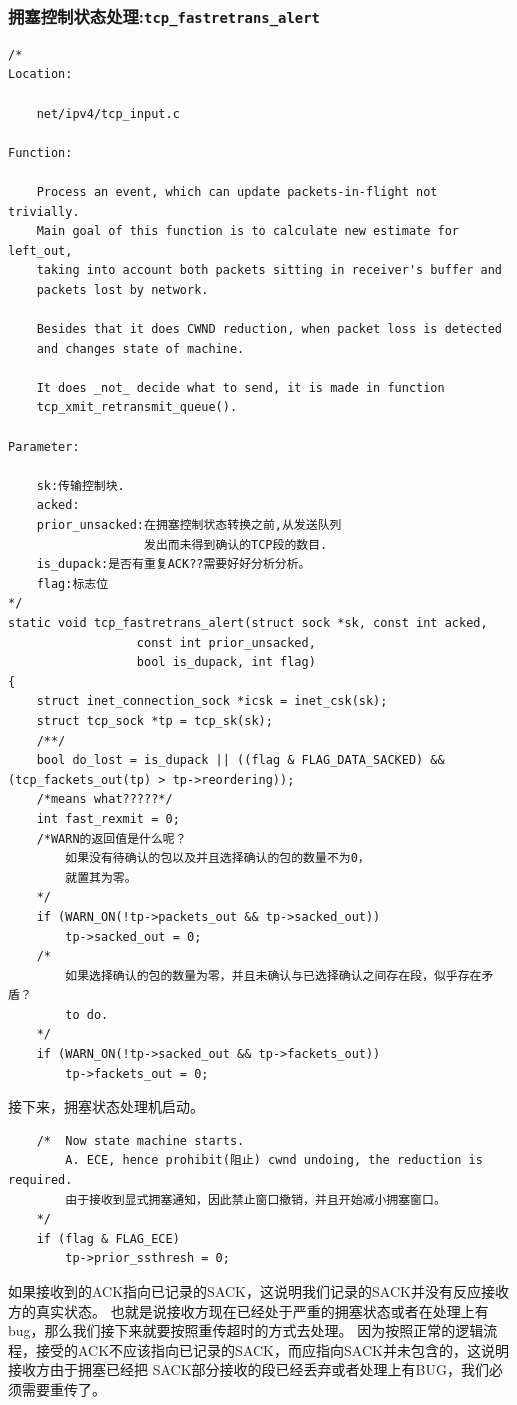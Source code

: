 		\subsubsection{拥塞控制状态处理:\texttt{tcp_fastretrans_alert}}
\begin{verbatim}
/* 
Location:

	net/ipv4/tcp_input.c

Function:

	Process an event, which can update packets-in-flight not trivially.
	Main goal of this function is to calculate new estimate for left_out,
	taking into account both packets sitting in receiver's buffer and
	packets lost by network.
	
	Besides that it does CWND reduction, when packet loss is detected
	and changes state of machine.
	
	It does _not_ decide what to send, it is made in function
	tcp_xmit_retransmit_queue().

Parameter:

	sk:传输控制块.
	acked:
	prior_unsacked:在拥塞控制状态转换之前,从发送队列
				   发出而未得到确认的TCP段的数目.
	is_dupack:是否有重复ACK??需要好好分析分析。
	flag:标志位
*/
static void tcp_fastretrans_alert(struct sock *sk, const int acked,
				  const int prior_unsacked,
				  bool is_dupack, int flag)
{
	struct inet_connection_sock *icsk = inet_csk(sk);
	struct tcp_sock *tp = tcp_sk(sk);
	/**/
	bool do_lost = is_dupack || ((flag & FLAG_DATA_SACKED) && (tcp_fackets_out(tp) > tp->reordering));
	/*means what?????*/	
	int fast_rexmit = 0;
	/*WARN的返回值是什么呢？
		如果没有待确认的包以及并且选择确认的包的数量不为0，
		就置其为零。
	*/
	if (WARN_ON(!tp->packets_out && tp->sacked_out))
		tp->sacked_out = 0;
	/*
		如果选择确认的包的数量为零，并且未确认与已选择确认之间存在段，似乎存在矛盾？
		to do.
	*/
	if (WARN_ON(!tp->sacked_out && tp->fackets_out))
		tp->fackets_out = 0;
\end{verbatim}

		接下来，拥塞状态处理机启动。
\begin{verbatim}
	/* 	Now state machine starts.
	 	A. ECE, hence prohibit(阻止) cwnd undoing, the reduction is required. 
		由于接收到显式拥塞通知，因此禁止窗口撤销，并且开始减小拥塞窗口。
	*/
	if (flag & FLAG_ECE)
		tp->prior_ssthresh = 0;
\end{verbatim}

	如果接收到的ACK指向已记录的SACK，这说明我们记录的SACK并没有反应接收方的真实状态。
	也就是说接收方现在已经处于严重的拥塞状态或者在处理上有bug，那么我们接下来就要按照重传超时的方式去处理。
	因为按照正常的逻辑流程，接受的ACK不应该指向已记录的SACK，而应指向SACK并未包含的，这说明接收方由于拥塞已经把
	SACK部分接收的段已经丢弃或者处理上有BUG，我们必须需要重传了。
	

